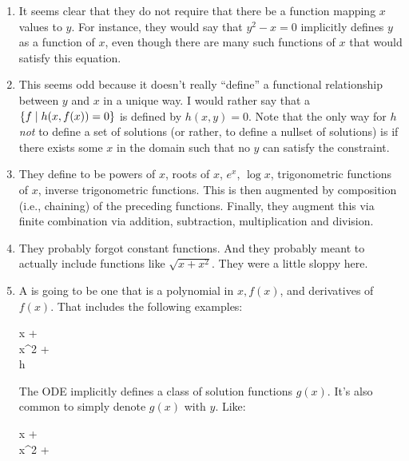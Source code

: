 \documentclass[11pt, oneside]{amsart}
\begin{document}
\begin{enumerate}
  \item It seems clear that they do not require that there be a
   function mapping $x$ values to $y$. For instance, they
  would say that $y^2 - x = 0$ implicitly defines $y$ as a function of
  $x$, even though there are many such functions of $x$ that would
  satisfy this equation.

  \item This seems odd because it doesn't really ``define'' a functional
  relationship between $y$ and $x$ in a unique way. I would rather say
  that a  $\left\{ f \mid h(x, f(x)) = 0 \right\}$ is
  defined by $h(x, y) = 0$. Note that the only way for $h$ \emph{not} to
  define a set of solutions (or rather, to define a nullset of
  solutions) is if there exists some $x$ in the domain such that no $y$
  can satisfy the constraint.

  \item They define  to be powers of $x$,
  roots of $x$, $e^x$, $\log x$, trigonometric functions of $x$, inverse
  trigonometric functions. This is then augmented by composition (i.e.,
  chaining) of the preceding functions. Finally, they augment this via
  finite combination via addition, subtraction, multiplication and
  division.

  \item They probably forgot constant functions. And they probably meant
  to actually include functions like $\sqrt{x + x^2}$. They were a
  little sloppy here.

  \item A  is going to be one
  that is a polynomial in $x, f(x)$, and derivatives of $f(x)$. That
  includes the following examples:

  \begin{nedqn}
    x + 
  \\
    x^2 + 
  \\
    h
  \end{nedqn}

  \noindent
  The ODE implicitly defines a class of solution functions $g(x)$. It's
  also common to simply denote $g(x)$ with $y$. Like:

  \begin{nedqn}
    x + 
  \\
    x^2 + 
  \end{nedqn}


\end{enumerate}
\end{document}

